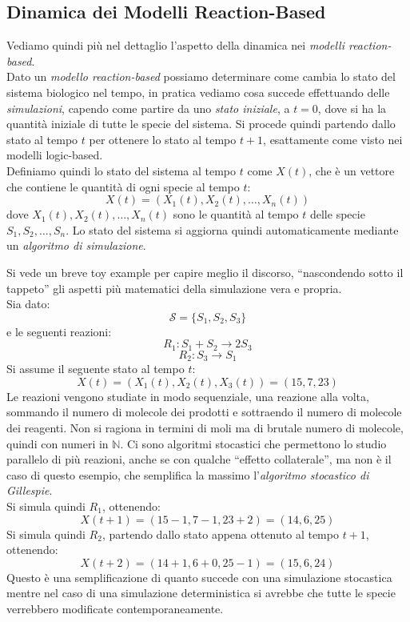 \documentclass[a4paper,12pt, oneside]{book}
\begin{document}
\subsection{Dinamica dei Modelli Reaction-Based}
Vediamo quindi più nel dettaglio l'aspetto della dinamica nei \textit{modelli
  reaction-based}.\\
Dato un \textit{modello reaction-based} possiamo determinare come cambia lo
stato del sistema biologico nel tempo, in pratica vediamo cosa succede
effettuando delle \textit{simulazioni}, capendo come partire da uno
\textit{stato iniziale}, a $t=0$, dove si ha la quantità iniziale di tutte le
specie del sistema. Si procede quindi partendo dallo stato al tempo $t$ per
ottenere lo stato al tempo $t+1$, esattamente come visto nei \textmd{modelli
  logic-based}. \\
Definiamo quindi lo stato del sistema al tempo $t$ come $X(t)$, che è un vettore
che contiene le quantità di ogni specie al tempo $t$:
\[X(t)=\left( X_1(t), X_2(t),\ldots, X_n(t)\right)\]
dove $X_1(t), X_2(t),\ldots, X_n(t)$ sono le quantità al tempo $t$ delle specie
$S_1, S_2,\ldots, S_n$. Lo stato del sistema si aggiorna quindi automaticamente
mediante un \textit{algoritmo di simulazione}.
\begin{esempio}
  Si vede un breve toy example per capire meglio il discorso, ``nascondendo
  sotto il tappeto'' gli aspetti più matematici della simulazione vera e
  propria.\\ 
  Sia dato:
  \[\mathcal{S}=\{S_1,S_2,S_3\}\]
  e le seguenti reazioni:
  \[R_1:S_1+S_2\to 2S_3\]
  \[R_2: S_3\to S_1\]
  Si assume il seguente stato al tempo $t$:
  \[X(t)=\left( X_1(t), X_2(t), X_3(t)\right) = (15,7,23)\]
  Le reazioni vengono studiate in modo sequenziale, una reazione alla volta,
  sommando il numero di molecole dei prodotti e sottraendo il numero di molecole 
  dei reagenti. Non si ragiona in termini di moli ma di brutale numero di
  molecole, quindi con numeri in $\mathbb{N}$. Ci sono algoritmi stocastici che
  permettono 
  lo studio parallelo di più reazioni, anche se con qualche ``effetto
  collaterale'',  ma non è il caso di questo esempio, che
  semplifica la massimo l'\textit{algoritmo stocastico di Gillespie}.\\ 
  Si simula quindi $R_1$, ottenendo:
  \[X(t+1)=(15-1, 7-1, 23+2) = (14, 6, 25)\]
  Si simula quindi $R_2$, partendo dallo stato appena ottenuto al tempo $t+1$,
  ottenendo: 
  \[X(t+2)=(14+1, 6+0, 25-1) = (15, 6, 24)\]
  Questo è una semplificazione di quanto succede con una simulazione stocastica
  mentre nel caso di una simulazione deterministica si avrebbe che tutte le
  specie verrebbero modificate contemporaneamente.
\end{esempio}
\end{document}
